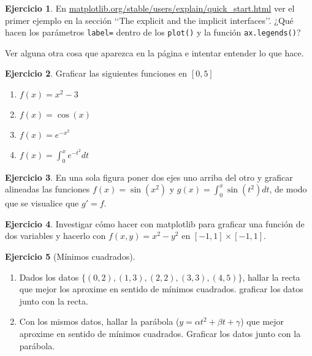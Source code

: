 \documentclass[a4paper,12pt]{book}
\theoremstyle{definition}
\newtheorem{ejercicio}{Ejercicio}
\begin{document}
	\begin{ejercicio}
		En \href{https://matplotlib.org/stable/users/explain/quick_start.html}{matplotlib.org/stable/users/explain/quick\_start.html} ver el primer ejemplo en la sección \lq\lq The explicit and the implicit interfaces\rq\rq. ¿Qué hacen los parámetros {\tt label=} dentro de los {\tt plot()} y la función {\tt ax.legends()}?
		
		Ver alguna otra cosa que aparezca en la página e intentar entender lo que hace.
	\end{ejercicio}
	
	\begin{ejercicio}
		Graficar las siguientes funciones en $[0,5]$
		\begin{enumerate}
			\item $f(x) = x^2 - 3$
			\item $f(x) = \cos(x)$
			\item $f(x) = e^{-x^2}$
			\item $f(x) = \int_0^xe^{-t^2}dt$
		\end{enumerate}
	\end{ejercicio}
	
	\begin{ejercicio}
		En una sola figura poner dos ejes uno arriba del otro y graficar alineadas las funciones $f(x)=\sin(x^2)$ y $g(x)=\int_0^x\sin(t^2)dt$, de modo que se visualice que $g'=f$. 
	\end{ejercicio}
	
	\begin{ejercicio}
		Investigar cómo hacer con matplotlib para graficar una función de dos variables y hacerlo con $f(x,y) = x^2 - y^2$ en $[-1,1]\times[-1,1]$.
	\end{ejercicio}
	
	\begin{ejercicio}[Mínimos cuadrados]
		\begin{enumerate}
			\item Dados los datos $\{(0,2), (1,3), (2,2), (3,3), (4,5)\}$, hallar la recta que mejor los aproxime en sentido de mínimos cuadrados. graficar los datos junto con la recta.
			
			\item Con los mismos datos, hallar la parábola ($y = \alpha t^2 + \beta t + \gamma$) que mejor aproxime en sentido de mínimos cuadrados. Graficar los datos junto con la parábola.
		\end{enumerate}
	\end{ejercicio}
	
\end{document}
